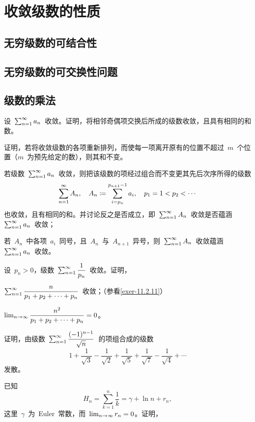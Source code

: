 \section{收敛级数的性质}
\subsection{无穷级数的可结合性}
\subsection{无穷级数的可交换性问题}
\subsection{级数的乘法}
\begin{exercise}
\item 设~$\sum_{n=1}^\infty a_n$~收敛。证明，将相邻奇偶项交换后所成的级数收敛，且具有相同的和数。
\item 证明，若将收敛级数的各项重新排列，而使每一项离开原有的位置不超过~$m$~个位置（$m$~为预先给定的数），则其和不变。
\item%
\begin{exlist}\FixExHead
  \item 若级数~$\sum_{n=1}^\infty a_n$~收敛，则把该级数的项经过组合而不变更其先后次序所得的级数
  \[
    \sum_{n=1}^\sinf A_n,\quad A_n\coloneq\sum_{i=p_n}^{p_{n+1}-1}a_i\mcond*{p_1=1<p_2<\dotsb}
  \]
  也收敛，且有相同的和。并讨论反之是否成立，即~$\sum_{n=1}^\infty A_n$~收敛是否蕴涵~$\sum_{n=1}^\infty a_n$~收敛；
  \item 若~$A_n$~中各项~$a_i$~同号，且~$A_n$~与~$A_{n+1}$~异号，则~$\sum_{n=1}^\infty A_n$~收敛蕴涵~$\sum_{n=1}^\infty a_n$~收敛。
\end{exlist}
\item 设~$p_n>0$，级数~$\sum_{n=1}^\infty\dfrac1{p_n}$~收敛。证明，
\begin{exlist}
  \item $\sum_{n=1}^\infty\dfrac n{p_1+p_2+\dotsb+p_n}$~收敛；（参看\ref{exer-11.2.11}）
  \item $\lim_{n\to\infty}\dfrac{n^2}{p_1+p_2+\dotsb+p_n}=0$。
\end{exlist}
\item 证明，由级数~$\sum_{n=1}^\infty\dfrac{(-1)^{n-1}}{\sqrt n}$~的项组合成的级数
\[
  1+\frac1{\sqrt 3}-\frac1{\sqrt 2}+\frac1{\sqrt 5}+\frac1{\sqrt 7}-\frac1{\sqrt 4}+\dotsb
\]
发散。
\item 已知
\[
  H_n=\sum_{k=1}^n\frac1k=\gamma+\ln n+r_n,
\]
这里~$\gamma$~为~Euler~常数，而~$\lim_{n\to\infty} r_n=0$。证明，

\end{exercise}
